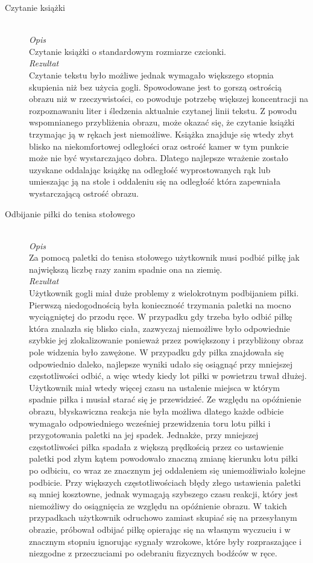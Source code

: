 \documentclass[a4paper,11pt,twoside]{report}
\theoremstyle{definition}
\begin{document}
\begin{description}
\item[Czytanie książki] \hfill \\
\textit{Opis} \\
Czytanie książki o standardowym rozmiarze czcionki. \\
\textit{Rezultat} \\
Czytanie tekstu było możliwe jednak wymagało większego stopnia skupienia niż bez użycia gogli. Spowodowane jest to gorszą ostrością obrazu niż w rzeczywistości, co powoduje potrzebę większej koncentracji na rozpoznawaniu liter i śledzenia aktualnie czytanej linii tekstu. Z powodu wspomnianego przybliżenia obrazu, może okazać się, że czytanie książki trzymając ją w rękach jest niemożliwe. Książka znajduje się wtedy zbyt blisko na niekomfortowej odległości oraz ostrość kamer w tym punkcie może nie być wystarczająco dobra. Dlatego najlepsze wrażenie zostało uzyskane oddalając książkę na odległość wyprostowanych rąk lub umieszając ją na stole i oddaleniu się na odległość która zapewniała wystarczającą ostrość obrazu.    

\item[Odbijanie piłki do tenisa stołowego] \hfill \\
\textit{Opis} \\
 Za pomocą paletki do tenisa stołowego użytkownik musi podbić piłkę jak największą liczbę razy zanim spadnie ona na ziemię. \\
\textit{Rezultat}\\
Użytkownik gogli miał duże problemy z wielokrotnym podbijaniem piłki. Pierwszą niedogodnością była konieczność trzymania paletki na mocno wyciągniętej do przodu ręce. W przypadku gdy trzeba było odbić piłkę która znalazła się blisko ciała, zazwyczaj niemożliwe było odpowiednie szybkie jej zlokalizowanie ponieważ przez powiększony i przybliżony obraz pole widzenia było zawężone. W przypadku gdy piłka znajdowała się odpowiednio daleko, najlepsze wyniki udało się osiągnąć przy mniejszej częstotliwości odbić, a więc wtedy kiedy lot piłki w powietrzu trwał dłużej. Użytkownik miał wtedy więcej czasu na ustalenie miejsca w którym spadnie piłka i musiał starać się je przewidzieć. Ze względu na opóźnienie obrazu, błyskawiczna reakcja nie była możliwa dlatego każde odbicie wymagało odpowiedniego wcześniej przewidzenia toru lotu piłki  i przygotowania paletki na jej spadek. Jednakże, przy mniejszej częstotliwości piłka spadała z większą prędkością przez co ustawienie paletki pod złym kątem powodowało znaczną zmianę kierunku lotu piłki po odbiciu, co wraz ze znacznym jej oddaleniem się uniemożliwiało kolejne podbicie. Przy większych częstotliwościach błędy złego ustawienia paletki są mniej kosztowne, jednak wymagają szybszego czasu reakcji, który jest niemożliwy do osiągnięcia ze względu na opóźnienie obrazu. W takich przypadkach użytkownik odruchowo zamiast skupiać się na przesyłanym obrazie, próbował odbijać piłkę opierając się na własnym wyczuciu i w znacznym stopniu ignorując sygnały wzrokowe, które były rozpraszające i niezgodne z przeczuciami po odebraniu fizycznych bodźców w ręce. 


\end{description}
\end{document}
